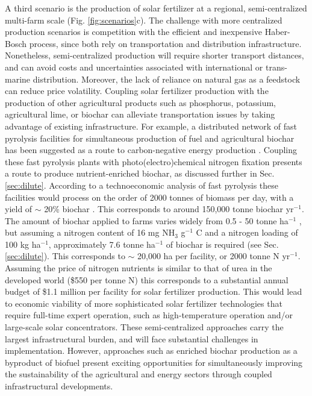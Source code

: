 A third scenario is the production of solar fertilizer at a regional, semi-centralized multi-farm scale (Fig. \ref{fig:scenarios}c). The challenge with more centralized production scenarios is competition with the efficient and inexpensive Haber-Bosch process, since both rely on transportation and distribution infrastructure. Nonetheless, semi-centralized production will require shorter transport distances, and can avoid costs and uncertainties associated with international or trans-marine distribution. Moreover, the lack of reliance on natural gas as a feedstock can reduce price volatility. Coupling solar fertilizer production with the production of other agricultural products such as phosphorus, potassium, agricultural lime, or biochar can alleviate transportation issues by taking advantage of existing infrastructure. For example, a distributed network of fast pyrolysis facilities for simultaneous production of fuel and agricultural biochar has been suggested as a route to carbon-negative energy production \cite{Lehmann2007,Lehmann_2007, Glaser2002}. Coupling these fast pyrolysis plants with photo(electro)chemical nitrogen fixation presents a route to produce nutrient-enriched biochar, as discussed further in Sec. \ref{sec:dilute}. According to a technoeconomic analysis of fast pyrolysis these facilities would process on the order of 2000 tonnes of biomass per day, with a yield of $\sim$ 20\% biochar  \cite{Wright_2010}. This corresponds to around 150,000 tonne biochar yr$^{-1}$. The amount of biochar applied to farms varies widely from 0.5 - 50 tonne ha$^{-1}$ \cite{Galinato2011}, but assuming a nitrogen content of 16 mg NH$_3$ g$^{-1}$ C and a nitrogen loading of 100 kg ha$^{-1}$, approximately 7.6 tonne ha$^{-1}$ of biochar is required (see Sec. \ref{sec:dilute}). This corresponds to $\sim$ 20,000 ha per facility, or 2000 tonne N yr$^{-1}$. Assuming the price of nitrogen nutrients is similar to that of urea in the developed world (\$550 per tonne N) this corresponds to a substantial annual budget of \$1.1 million per facility for solar fertilizer production. This would lead to economic viability of more sophisticated solar fertilizer technologies that require full-time expert operation, such as high-temperature operation and/or large-scale solar concentrators. These semi-centralized approaches carry the largest infrastructural burden, and will face substantial challenges in implementation. However, approaches such as enriched biochar production as a byproduct of biofuel present exciting opportunities for simultaneously improving the sustainability of the agricultural and energy sectors through coupled infrastructural developments.

